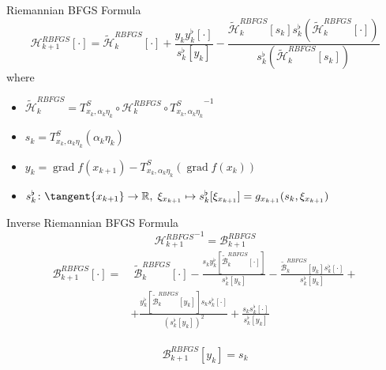 \documentclass[9.4pt]{beamer}
\begin{document}
\begin{frame}{Riemannian BFGS Formula}
    \begin{equation*}
        \mathcal{H}^{RBFGS}_{k+1} [\cdot] = \widetilde{\mathcal{H}}^{RBFGS}_k [\cdot] + \frac{y_k y^{\flat}_k[\cdot]}{s^{\flat}_k [y_k]} - \frac{\widetilde{\mathcal{H}}^{RBFGS}_k [s_k] s^{\flat}_k (\widetilde{\mathcal{H}}^{RBFGS}_k [\cdot])}{s^{\flat}_k (\widetilde{\mathcal{H}}^{RBFGS}_k [s_k])}
    \end{equation*}
    where 
    \begin{itemize}
        \item $\widetilde{\mathcal{H}}^{RBFGS}_k = T^{S}_{x_k, \alpha_k \eta_k} \circ \mathcal{H}^{RBFGS}_k \circ {T^{S}_{x_k, \alpha_k \eta_k}}^{-1}$
        \item $s_k = T^{S}_{x_k, \alpha_k \eta_k}(\alpha_k \eta_k)$
        \item $y_k = \operatorname{grad} f(x_{k+1}) - T^{S}_{x_k, \alpha_k \eta_k}(\operatorname{grad} f(x_k))$
        \item $s^{\flat}_k \colon \tangent{x_{k+1}} \to \mathbb{R}, \;  \xi_{x_{k+1}} \mapsto s^{\flat}_k[\xi_{x_{k+1}}] = g_{x_{k+1}} (s_k, \xi_{x_{k+1}})$
    \end{itemize}
\end{frame}

\begin{frame}{Inverse Riemannian BFGS Formula}
    \begin{equation*}
        {\mathcal{H}^{RBFGS}_{k+1}}^{-1} = \mathcal{B}^{RBFGS}_{k+1} 
    \end{equation*}
    \begin{equation*}
        \begin{split}
            \mathcal{B}^{RBFGS}_{k+1} [\cdot] = & \; \widetilde{\mathcal{B}}^{RBFGS}_k [\cdot] -  \frac{s_k y^{\flat}_k[\widetilde{\mathcal{B}}^{RBFGS}_k [\cdot]]}{s^{\flat}_k [y_k]} - \frac{\widetilde{\mathcal{B}}^{RBFGS}_k [y_k]  s^{\flat}_k [\cdot]}{s^{\flat}_k [y_k]} + \\ & + \frac{y^{\flat}_k[\widetilde{\mathcal{B}}^{RBFGS}_k [y_k]] s_k s^{\flat}_k [\cdot]}{(s^{\flat}_k [y_k])^2} + \frac{s_k s^{\flat}_k [\cdot]}{s^{\flat}_k [y_k]}
        \end{split}
    \end{equation*} \\[0.3\baselineskip]
    \begin{equation*}
        \mathcal{B}^{RBFGS}_{k+1} [y_k] = s_k
    \end{equation*}
\end{frame}
\end{document}
